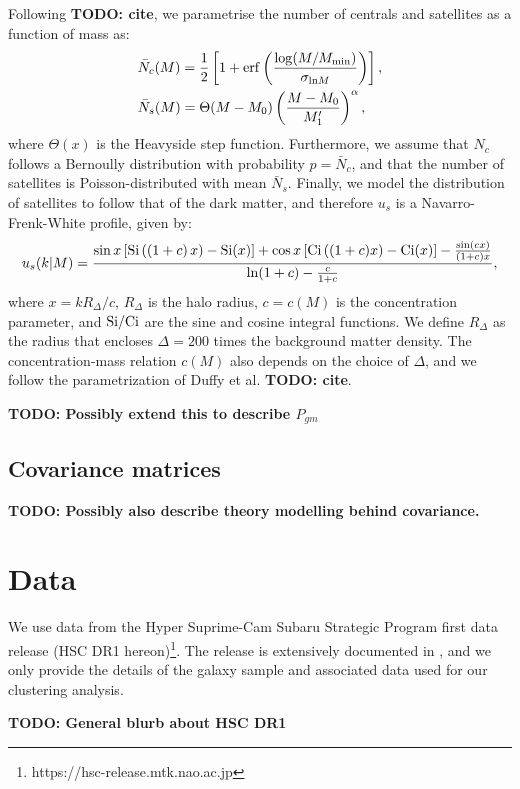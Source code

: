 \documentclass[a4paper,11pt]{article}
\newcommand{\todo}[1]{{\bf TODO: #1}}
\begin{document}
    Following \todo{cite}, we parametrise the number of centrals and satellites as a function of mass as:
    \begin{align}
      &\bar{N}_c(M)=\frac{1}{2}\left[1+{\rm erf}\left(\frac{\log(M/M_{\rm min})}{\sigma_{{\rm ln}M}}\right)\right],\\
      &\bar{N}_s(M)=\Theta(M-M_0)\left(\frac{M-M_0}{M_1'}\right)^\alpha,
    \end{align}
    where $\Theta(x)$ is the Heavyside step function. Furthermore, we assume that $N_c$ follows a Bernoully distribution with probability $p=\bar{N}_c$, and that the number of satellites is Poisson-distributed with mean $\bar{N}_s$. Finally, we model the distribution of satellites to follow that of the dark matter, and therefore $u_s$ is a Navarro-Frenk-White profile, given by:
    \begin{equation}
      u_s(k|M)=\frac{\sin x\left[{\rm Si}\left((1+c)\,x\right)-{\rm Si}(x)\right]+\cos x\left[{\rm Ci}\left((1+c)x\right)-{\rm Ci}(x)\right]-\frac{\sin(cx)}{(1+c)x}}{{\rm ln}(1+c)-\frac{c}{1+c}},
    \end{equation}
    where $x=k R_\Delta/c$, $R_\Delta$ is the halo radius, $c=c(M)$ is the concentration parameter, and ${\rm Si}/{\rm Ci}$ are the sine and cosine integral functions. We define $R_\Delta$ as the radius that encloses $\Delta=200$ times the background matter density. The concentration-mass relation $c(M)$ also depends on the choice of $\Delta$, and we follow the parametrization of Duffy et al. \todo{cite}.

    \todo{Possibly extend this to describe $P_{gm}$}
    
  \subsection{Covariance matrices}\label{ssec:theory.ssc}
    \todo{Possibly also describe theory modelling behind covariance. }
    \lipsum[3]

\section{Data}\label{sec:data}
  We use data from the Hyper Suprime-Cam Subaru Strategic Program first data release (HSC DR1 hereon)\footnote{https://hsc-release.mtk.nao.ac.jp}. The release is extensively documented in \cite{2018PASJ...70S...8A}, and we only provide the details of the galaxy sample and associated data used for our clustering analysis.
  
  \todo{General blurb about HSC DR1}
  
\end{document}
